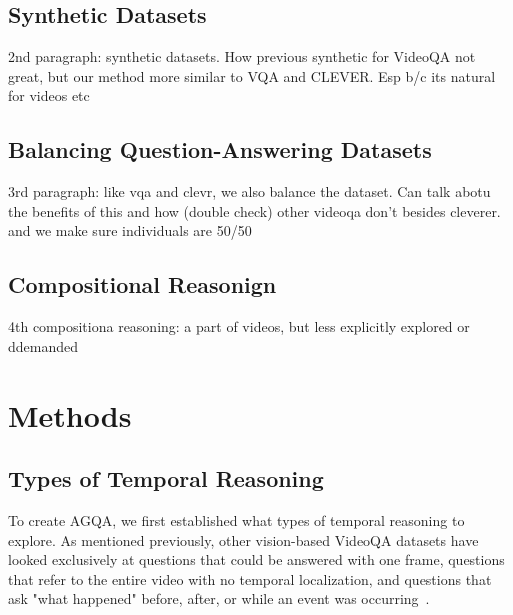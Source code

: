 \documentclass[10pt,twocolumn,letterpaper]{article}
\newcommand{\mgm}[1]{{\color{cyan}{mgm: #1}}}
\begin{document}
\subsection{Synthetic Datasets}
2nd paragraph: synthetic datasets. How previous synthetic for VideoQA not great, but our method more similar to VQA and CLEVER. Esp b/c its natural for videos etc

\subsection{Balancing Question-Answering Datasets}
3rd paragraph: like vqa and clevr, we also balance the dataset. Can talk abotu the benefits of this and how (double check) other videoqa don't besides cleverer. and we make sure individuals are 50/50

\subsection{Compositional Reasonign}
4th compositiona reasoning: a part of videos, but less explicitly explored or ddemanded



\section{Methods}

\subsection{Types of Temporal Reasoning}
To create AGQA, we first established what types of temporal reasoning to explore. As mentioned previously, other vision-based VideoQA datasets have looked exclusively at questions that could be answered with one frame, questions that refer to the entire video with no temporal localization, and questions that ask "what happened" before, after, or while an event was occurring~\cite{tapaswi2016movieqa,lei2018tvqa,jang2017tgif,kim2017deepstory,xu2017video,maharaj2017dataset,zeng2016leveraging,yu2019activitynet}. \mgm{again, clunky way of describing}

\end{document}
